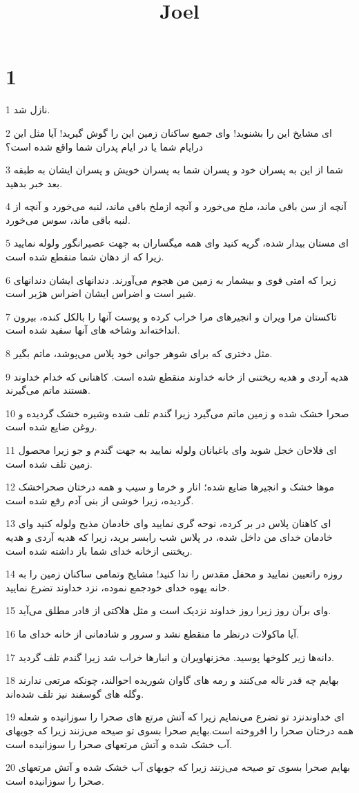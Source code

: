 

\title{Joel}


\chapter{1}

\par 1 نازل شد.
\par 2 ‌ای مشایخ این را بشنوید! و‌ای جمیع ساکنان زمین این را گوش گیرید! آیا مثل این درایام شما یا در ایام پدران شما واقع شده است؟
\par 3 شما از این به پسران خود و پسران شما به پسران خویش و پسران ایشان به طبقه بعد خبر بدهید.
\par 4 آنچه از سن باقی ماند، ملخ می‌خورد و آنچه ازملخ باقی ماند، لنبه می‌خورد و آنچه از لنبه باقی ماند، سوس می‌خورد.
\par 5 ‌ای مستان بیدار شده، گریه کنید و‌ای همه میگساران به جهت عصیرانگور ولوله نمایید زیرا که از دهان شما منقطع شده است.
\par 6 زیرا که امتی قوی و بیشمار به زمین من هجوم می‌آورند. دندانهای ایشان دندانهای شیر است و اضراس ایشان اضراس هژبر است.
\par 7 تاکستان مرا ویران و انجیرهای مرا خراب کرده و پوست آنها را بالکل کنده، بیرون انداخته‌اند وشاخه های آنها سفید شده است.
\par 8 مثل دختری که برای شوهر جوانی خود پلاس می‌پوشد، ماتم بگیر.
\par 9 هدیه آردی و هدیه ریختنی از خانه خداوند منقطع شده است. کاهنانی که خدام خداوند هستند ماتم می‌گیرند.
\par 10 صحرا خشک شده و زمین ماتم می‌گیرد زیرا گندم تلف شده وشیره خشک گردیده و روغن ضایع شده است.
\par 11 ‌ای فلاحان خجل شوید و‌ای باغبانان ولوله نمایید به جهت گندم و جو زیرا محصول زمین تلف شده است.
\par 12 موها خشک و انجیرها ضایع شده؛ انار و خرما و سیب و همه درختان صحراخشک گردیده، زیرا خوشی از بنی آدم رفع شده است.
\par 13 ‌ای کاهنان پلاس در بر کرده، نوحه گری نمایید و‌ای خادمان مذبح ولوله کنید و‌ای خادمان خدای من داخل شده، در پلاس شب رابسر برید، زیرا که هدیه آردی و هدیه ریختنی ازخانه خدای شما باز داشته شده است.
\par 14 روزه راتعیین نمایید و محفل مقدس را ندا کنید! مشایخ وتمامی ساکنان زمین را به خانه یهوه خدای خودجمع نموده، نزد خداوند تضرع نمایید.
\par 15 وای برآن روز زیرا روز خداوند نزدیک است و مثل هلاکتی از قادر مطلق می‌آید.
\par 16 آیا ماکولات درنظر ما منقطع نشد و سرور و شادمانی از خانه خدای ما.
\par 17 دانه‌ها زیر کلوخها پوسید. مخزنهاویران و انبارها خراب شد زیرا گندم تلف گردید.
\par 18 بهایم چه قدر ناله می‌کنند و رمه های گاوان شوریده احوالند، چونکه مرتعی ندارند وگله های گوسفند نیز تلف شده‌اند.
\par 19 ‌ای خداوندنزد تو تضرع می‌نمایم زیرا که آتش مرتع های صحرا را سوزانیده و شعله همه درختان صحرا را افروخته است.بهایم صحرا بسوی تو صیحه می‌زنند زیرا که جویهای آب خشک شده و آتش مرتعهای صحرا را سوزانیده است.
\par 20 بهایم صحرا بسوی تو صیحه می‌زنند زیرا که جویهای آب خشک شده و آتش مرتعهای صحرا را سوزانیده است.

